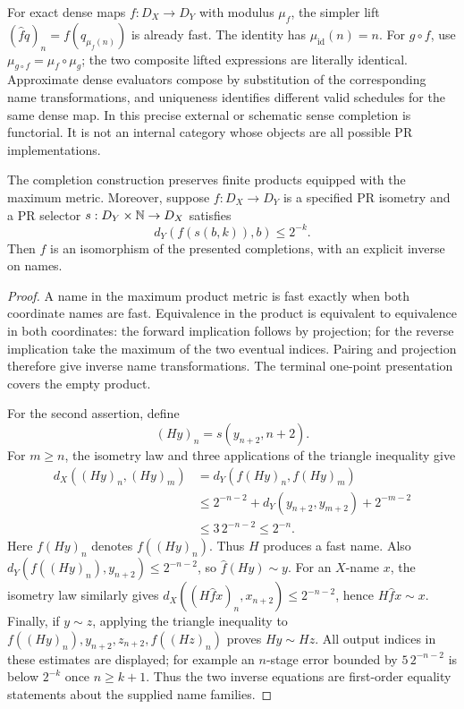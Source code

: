 For exact dense maps $f:D_X\to D_Y$ with modulus $\mu_f$, the simpler lift
$(\widehat f q)_n=f(q_{\mu_f(n)})$ is already fast.  The identity has
$\mu_{\mathrm{id}}(n)=n$.  For $g\circ f$, use
$\mu_{g\circ f}=\mu_f\circ\mu_g$; the two composite lifted expressions are
literally identical.  Approximate dense evaluators compose by substitution of
the corresponding name transformations, and uniqueness identifies different
valid schedules for the same dense map.  In this precise external or
schematic sense completion is functorial.  It is not an internal category
whose objects are all possible PR implementations.

\begin{proposition}
\label{prop:cm-products-density}
The completion construction preserves finite products equipped with the
maximum metric.  Moreover, suppose $f:D_X\to D_Y$ is a specified PR isometry
and a PR selector $s:D_Y\times\mathbb N\to D_X$ satisfies
\[
                    d_Y(f(s(b,k)),b)\leq2^{-k}.
\tag{C5}\label{eq:cm-dense-selector}
\]
Then $\widehat f$ is an isomorphism of the presented completions, with an
explicit inverse on names.
\end{proposition}

\begin{proof}
A name in the maximum product metric is fast exactly when both coordinate
names are fast.  Equivalence in the product is equivalent to equivalence in
both coordinates: the forward implication follows by projection; for the
reverse implication take the maximum of the two eventual indices.  Pairing
and projection therefore give inverse name transformations.  The terminal
one-point presentation covers the empty product.

For the second assertion, define
\[
                  (Hy)_n=s(y_{n+2},n+2).
\tag{C6}\label{eq:cm-density-inverse}
\]
For $m\geq n$, the isometry law and three applications of the triangle
inequality give
\[
\begin{split}
 d_X((Hy)_n,(Hy)_m)
 &=d_Y(f(Hy)_n,f(Hy)_m)\\
 &\leq2^{-n-2}+d_Y(y_{n+2},y_{m+2})+2^{-m-2}\\
 &\leq3\,2^{-n-2}\leq2^{-n}.
\end{split}
\]
Here $f(Hy)_n$ denotes $f((Hy)_n)$.  Thus $H$ produces a fast name.  Also
$d_Y(f((Hy)_n),y_{n+2})\leq2^{-n-2}$, so $\widehat f(Hy)\sim y$.
For an $X$-name $x$, the isometry law similarly gives
$d_X((H\widehat f x)_n,x_{n+2})\leq2^{-n-2}$, hence
$H\widehat f x\sim x$.  Finally, if $y\sim z$, applying the triangle
inequality to $f((Hy)_n),y_{n+2},z_{n+2},f((Hz)_n)$ proves $Hy\sim Hz$.
All output indices in these estimates are displayed; for example an
$n$-stage error bounded by $5\,2^{-n-2}$ is below $2^{-k}$ once
$n\geq k+1$.  Thus the two inverse equations are first-order equality
statements about the supplied name families.
\end{proof}

